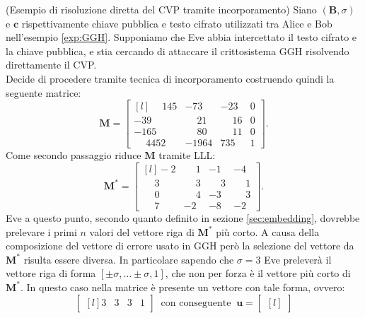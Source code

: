 \begin{exmp} (Esempio di risoluzione diretta del CVP tramite incorporamento)
\label{exp:embedding}
Siano $(\mathbf{B}, \sigma)$ e $\mathbf{c}$ rispettivamente chiave pubblica e testo cifrato
utilizzati tra Alice e Bob nell'esempio \ref{exp:GGH}. Supponiamo che Eve abbia intercettato 
il testo cifrato e la chiave pubblica, e stia cercando di attaccare il crittosistema GGH
risolvendo direttamente il CVP.\\ Decide di procedere tramite tecnica di incorporamento
costruendo quindi la seguente matrice:
\begin{equation*}
    \mathbf{M} =
    \begin{bmatrix*}[l]
        \phantom{-}145 & -73 & -23 & 0\\
        -39 & \phantom{-}21 & \phantom{-}16 & 0\\
        -165 & \phantom{-}80 & \phantom{-}11 & 0 \\
        \phantom{-}4452 & -1964 & 735 & 1
    \end{bmatrix*}.
\end{equation*}
Come secondo passaggio riduce $\mathbf{M}$ tramite LLL:
\begin{equation*}
    \mathbf{M}^* =
    \begin{bmatrix*}[l]
        -2           & \phantom{-}1  & -1 & -4\\
        \phantom{-}3 & \phantom{-}3  & \phantom{-}3 & \phantom{-}1\\
        \phantom{-}0 & \phantom{-}4  & -3 & \phantom{-}3 \\
        \phantom{-}7 & -2            & -8 & -2
    \end{bmatrix*}.
\end{equation*}
Eve a questo punto, secondo quanto definito in sezione \ref{sec:embedding}, dovrebbe prelevare 
i primi $n$ valori del vettore riga di $\mathbf{M}^*$ più corto. A causa della composizione del
vettore di errore usato in GGH però la selezione del vettore da $\mathbf{M}^*$ risulta 
essere diversa. In particolare sapendo che $\sigma = 3$ Eve preleverà il vettore riga di 
forma $[\pm\sigma, \dots\pm\sigma,  1]$, che non per forza è il vettore più corto di $\mathbf{M}^*$.
In questo caso nella matrice è presente un vettore con tale forma, ovvero:
\begin{equation*}
    \begin{bmatrix*}[l]
        3 & 3 & 3 & 1
    \end{bmatrix*}
    \ \text{ con conseguente } \
    \mathbf{u} =
    \begin{bmatrix*}[l]

\end{bmatrix*}
\end{equation*}
\end{exmp}
